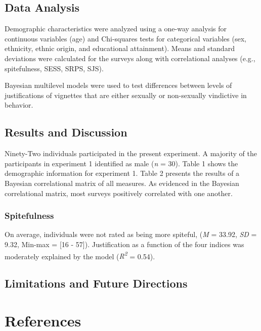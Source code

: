 \documentclass[
  english,
  a4paper]{apa7}
\begin{document}
\hypertarget{data-analysis}{%
\subsection{Data Analysis}\label{data-analysis}}

Demographic characteristics were analyzed using a one-way analysis for continuous variables (age) and Chi-squares tests for categorical variables (sex, ethnicity, ethnic origin, and educational attainment). Means and standard deviations were calculated for the surveys along with correlational analyses (e.g., spitefulness, SESS, SRPS, SJS).

Bayesian multilevel models were used to test differences between levels of justifications of vignettes that are either sexually or non-sexually vindictive in behavior.

\hypertarget{results-and-discussion}{%
\subsection{Results and Discussion}\label{results-and-discussion}}

Ninety-Two individuals participated in the present experiment. A majority of the participants in experiment 1 identified as male (\emph{n} = 30). Table 1 shows the demographic information for experiment 1. Table 2 presents the results of a Bayesian correlational matrix of all measures. As evidenced in the Bayesian correlational matrix, most surveys positively correlated with one another.

\hypertarget{spitefulness-1}{%
\subsubsection{Spitefulness}\label{spitefulness-1}}

On average, individuals were not rated as being more spiteful, (\emph{M} = 33.92, \emph{SD} = 9.32, Min-max = {[}16 - 57{]}). Justification as a function of the four indices was moderately explained by the model (\emph{R\textsuperscript{2}} = 0.54).

\hypertarget{limitations-and-future-directions}{%
\subsection{Limitations and Future Directions}\label{limitations-and-future-directions}}

\newpage

\hypertarget{references}{%
\section{References}\label{references}}
\end{document}
